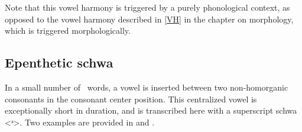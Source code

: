 Note that this vowel harmony is triggered by a purely phonological context, as opposed to the vowel harmony described in \SEC\ref{VH} in the chapter on morphology, which is triggered morphologically. 


\subsection{Epenthetic schwa}\label{epentheticSchwa}
In a small number of \PS\ words, a vowel is inserted between two non-homorganic consonants in the consonant center position. %
This centralized vowel is exceptionally short in duration, and is transcribed here with a %
superscript schwa <ᵊ>. Two examples are provided in  and .

